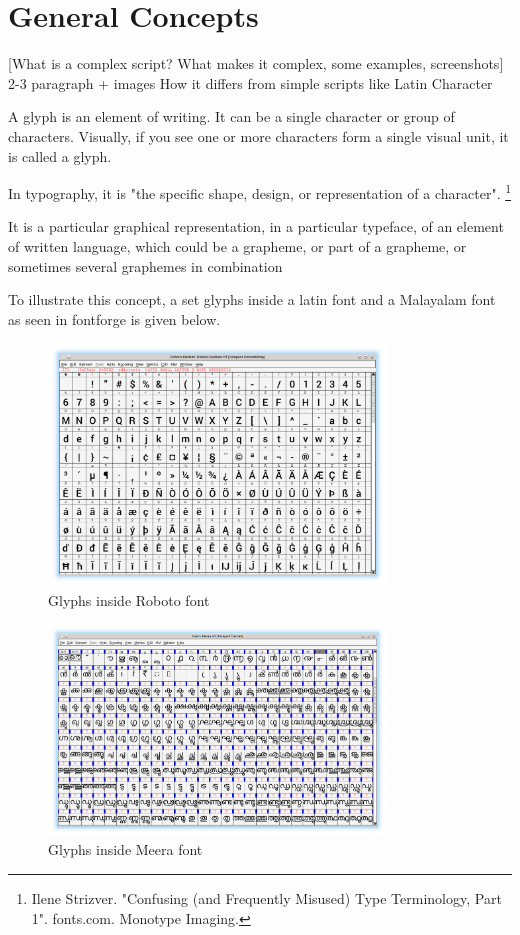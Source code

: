 \chapter{General Concepts} 


[What is a complex script? What makes it complex, some examples, screenshots]
2-3 paragraph + images
How it differs from simple scripts like Latin
Character

A glyph is an element of writing. It can be a single character or group of characters. 
Visually, if you see one or more characters form a single visual unit, it is called a glyph.

In typography, it is "the specific shape, design, or representation of a character".
\footnote{Ilene Strizver. "Confusing (and Frequently Misused) Type Terminology, Part 1". fonts.com. Monotype Imaging.}

It is a particular graphical representation, in a particular typeface, of an element of written language, which could be a grapheme, or part of a grapheme, or sometimes several graphemes in combination 
 
To illustrate this concept, a set glyphs inside a latin font and a Malayalam font as seen in fontforge is given below.

\begin{figure}[h]
    \centering
    \includegraphics[width=0.8\textwidth]{glyph-fontforge-roboto.png}
    \caption{Glyphs inside Roboto font}
\end{figure}

\begin{figure}[h]
    \centering
    \includegraphics[width=0.8\textwidth]{glyph-fontforge-meera.png}
    \caption{Glyphs inside Meera font}
\end{figure}

